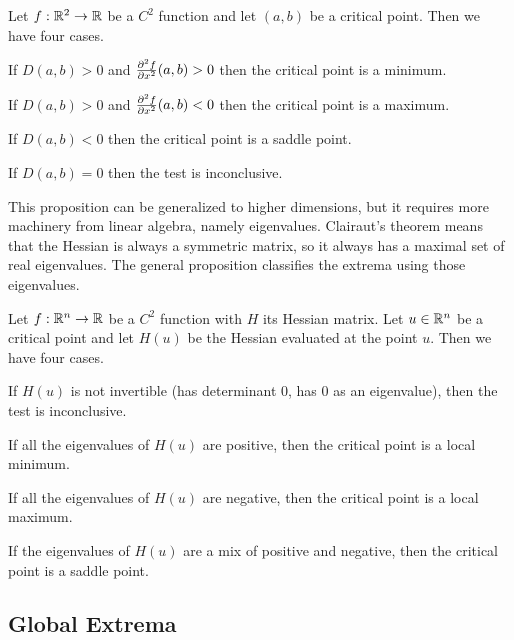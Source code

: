 \documentclass[fleqn,letterpaper]{report}
\begin{document}
\begin{prop}
Let $f: \mathbb{R}^2 \rightarrow \mathbb{R}$ be a $C^2$ function and let
$(a,b)$ be a critical point. Then we have four cases.
\begin{smallitemize}
\item If $D(a,b) > 0$ and $\frac{\partial^2 f}{\partial x^2} (a,b) >
0$ then the critical point is a minimum.
\item If $D(a,b) > 0$ and $\frac{\partial^2 f}{\partial x^2} (a,b) < 0$ then
the critical point is a maximum.
\item If $D(a,b) < 0$ then the critical point is a saddle
point.
\item If $D(a,b) = 0$ then the test is inconclusive.
\end{smallitemize}
\end{prop}

This proposition can be generalized to higher dimensions, but
it requires more machinery from linear algebra, namely
eigenvalues. Clairaut's theorem means that the Hessian is
always a symmetric matrix, so it always has a maximal set of
real eigenvalues. The general proposition classifies the
extrema using those eigenvalues.

\begin{prop}
Let $f: \mathbb{R}^n \rightarrow \mathbb{R}$ be a $C^2$ function with $H$
its Hessian matrix. Let $u \in \mathbb{R}^n$ be a critical point and
let $H(u)$ be the Hessian evaluated at the point $u$. Then we
have four cases.
\begin{smallitemize}
\item If $H(u)$ is not invertible (has determinant 0, has 0 as
an eigenvalue), then the test is inconclusive. 
\item If all the eigenvalues of $H(u)$ are positive, then the
critical point is a local minimum.
\item If all the eigenvalues of $H(u)$ are negative, then the
critical point is a local maximum.
\item If the eigenvalues of $H(u)$ are a mix of positive and
negative, then the critical point is a saddle point.
\end{smallitemize}
\end{prop}

\subsection{Global Extrema}
\label{global-extrema}
\end{document}
